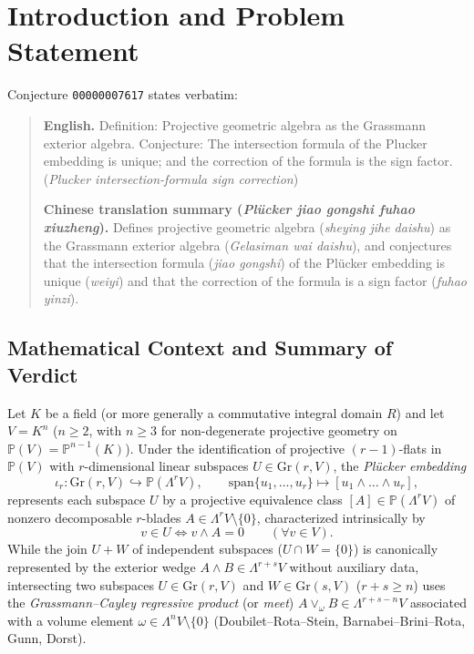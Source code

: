 \documentclass[11pt]{article}
\theoremstyle{definition}
\newcommand{\Gr}{\mathrm{Gr}}
\newcommand{\spn}{\mathrm{span}}
\newcommand{\Psp}{\mathbb{P}}
\begin{document}
\section{Introduction and Problem Statement}

Conjecture \texttt{00000007617} states verbatim:
\begin{quote}
\textbf{English.} Definition: Projective geometric algebra as the Grassmann exterior algebra. Conjecture: The intersection formula of the Plucker embedding is unique; and the correction of the formula is the sign factor. (\emph{Plucker intersection-formula sign correction})

\textbf{Chinese translation summary (\emph{Pl\"ucker jiao gongshi fuhao xiuzheng}).} Defines projective geometric algebra (\emph{sheying jihe daishu}) as the Grassmann exterior algebra (\emph{Gelasiman wai daishu}), and conjectures that the intersection formula (\emph{jiao gongshi}) of the Pl\"ucker embedding is unique (\emph{weiyi}) and that the correction of the formula is a sign factor (\emph{fuhao yinzi}).
\end{quote}

\subsection*{Mathematical Context and Summary of Verdict}

Let $K$ be a field (or more generally a commutative integral domain $R$) and let $V = K^n$ ($n \ge 2$, with $n \ge 3$ for non-degenerate projective geometry on $\Psp(V) = \Psp^{n-1}(K)$). Under the identification of projective $(r-1)$-flats in $\Psp(V)$ with $r$-dimensional linear subspaces $U \in \Gr(r,V)$, the \emph{Pl\"ucker embedding}
\[
  \iota_r : \Gr(r, V) \hookrightarrow \Psp(\Lambda^r V), \qquad \spn\{u_1, \dots, u_r\} \longmapsto [u_1 \wedge \dots \wedge u_r],
\]
represents each subspace $U$ by a projective equivalence class $[A] \in \Psp(\Lambda^r V)$ of nonzero decomposable $r$-blades $A \in \Lambda^r V \setminus \{0\}$, characterized intrinsically by
\begin{equation}\label{eq:membership}
  v \in U \Longleftrightarrow v \wedge A = 0 \qquad (\forall v \in V).
\end{equation}
While the join $U + W$ of independent subspaces ($U \cap W = \{0\}$) is canonically represented by the exterior wedge $A \wedge B \in \Lambda^{r+s} V$ without auxiliary data, intersecting two subspaces $U \in \Gr(r,V)$ and $W \in \Gr(s,V)$ ($r + s \ge n$) uses the \emph{Grassmann--Cayley regressive product} (or \emph{meet}) $A \vee_\omega B \in \Lambda^{r+s-n} V$ associated with a volume element $\omega \in \Lambda^n V \setminus \{0\}$ (Doubilet--Rota--Stein, Barnabei--Brini--Rota, Gunn, Dorst).
\end{document}
